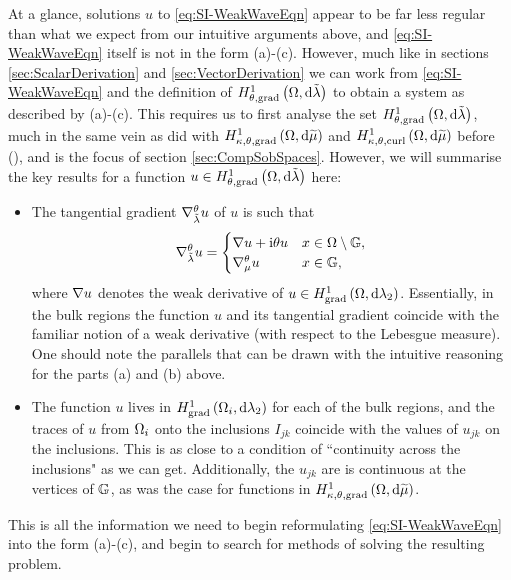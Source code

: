 At a glance, solutions $u$ to \eqref{eq:SI-WeakWaveEqn} appear to be far less regular than what we expect from our intuitive arguments above, and \eqref{eq:SI-WeakWaveEqn} itself is not in the form (a)-(c).
However, much like in sections \ref{sec:ScalarDerivation} and \ref{sec:VectorDerivation} we can work from \eqref{eq:SI-WeakWaveEqn} and the definition of $H^1_{\theta, \mathrm{grad}}\left( \Omega, \mathrm{d}\tilde{\lambda} \right)$ to obtain a system as described by (a)-(c).
This requires us to first analyse the set $H^1_{\theta, \mathrm{grad}}\left( \Omega, \mathrm{d}\tilde{\lambda} \right)$, much in the same vein as did with $H^1_{\kappa,\theta,\mathrm{grad}}\left( \Omega, \mathrm{d}\widetilde{\mu} \right)$ and $H^1_{\kappa,\theta,\mathrm{curl}}\left( \Omega, \mathrm{d}\widetilde{\mu} \right)$ before (), and is the focus of section \ref{sec:CompSobSpaces}.
However, we will summarise the key results for a function $u\in H^1_{\theta, \mathrm{grad}}\left( \Omega, \mathrm{d}\tilde{\lambda} \right)$ here:
\begin{itemize}
	\item The tangential gradient $\nabla^{\theta}_{\tilde{\lambda}}u$ of $u$ is such that
	\begin{align*}
		\nabla^{\theta}_{\tilde{\lambda}}u = \begin{cases} \nabla u + \mathrm{i}\theta u & x\in\Omega\setminus\mathbb{G}, \\ \nabla^{\theta}_{\mu}u & x\in\mathbb{G}, \end{cases}
	\end{align*}
	where $\nabla u$ denotes the weak derivative of $u\in H^1_\mathrm{grad}\left( \Omega, \mathrm{d}\lambda_2 \right)$.
	Essentially, in the bulk regions the function $u$ and its tangential gradient coincide with the familiar notion of a weak derivative (with respect to the Lebesgue measure).
	One should note the parallels that can be drawn with the intuitive reasoning for the parts (a) and (b) above.
	\item The function $u$ lives in $H^1_\mathrm{grad}\left( \Omega_i, \mathrm{d}\lambda_2 \right)$ for each of the bulk regions, and the traces of $u$ from $\Omega_i$ onto the inclusions $I_{jk}$ coincide with the values of $u_{jk}$ on the inclusions.
	This is as close to a condition of ``continuity across the inclusions" as we can get.
	Additionally, the $u_{jk}$ are is continuous at the vertices of $\mathbb{G}$, as was the case for functions in $H^1_{\kappa,\theta,\mathrm{grad}}\left( \Omega, \mathrm{d}\widetilde{\mu} \right)$.
\end{itemize}
This is all the information we need to begin reformulating \eqref{eq:SI-WeakWaveEqn} into the form (a)-(c), and begin to search for methods of solving the resulting problem.